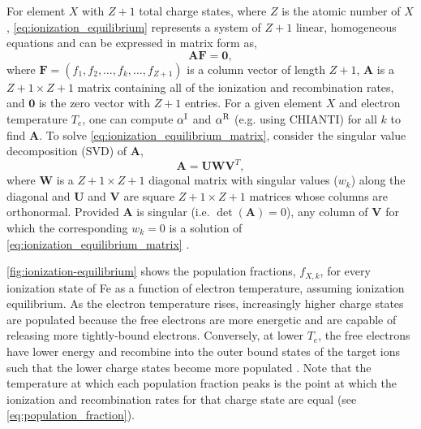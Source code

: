 For element $X$ with $Z+1$ total charge states, where $Z$ is the atomic number of $X$, \autoref{eq:ionization_equilibrium} represents a system of $Z+1$ linear, homogeneous equations and can be expressed in matrix form as,
\begin{equation}\label{eq:ionization_equilibrium_matrix}
    \mathbf{A}\mathbf{F} = \mathbf{0},
\end{equation}
where $\mathbf{F}=(f_1,f_2,\ldots,f_k,\ldots,f_{Z+1})$ is a column vector of length $Z+1$, $\mathbf{A}$ is a $Z+1{\times}Z+1$ matrix containing all of the ionization and recombination rates, and $\mathbf{0}$ is the zero vector with $Z+1$ entries. For a given element $X$ and electron temperature $T_e$, one can compute $\alpha^\textup{I}$ and $\alpha^\textup{R}$ (e.g. using CHIANTI) for all $k$ to find $\mathbf{A}$. To solve \autoref{eq:ionization_equilibrium_matrix}, consider the singular value decomposition (SVD) of $\mathbf{A}$,
\begin{equation}
    \mathbf{A} = \mathbf{U}\mathbf{W}\mathbf{V}^T,
\end{equation}
where $\mathbf{W}$ is a $Z+1{\times}Z+1$ diagonal matrix with singular values ($w_k$) along the diagonal and $\mathbf{U}$ and $\mathbf{V}$ are  square $Z+1{\times}Z+1$ matrices whose columns are orthonormal. Provided $\mathbf{A}$ is singular (i.e. $\det{(\mathbf{A})}=0$), any column of $\mathbf{V}$ for which the corresponding $w_k=0$ is a solution of \autoref{eq:ionization_equilibrium_matrix} \citep{press_numerical_1992}. 

\autoref{fig:ionization-equilibrium} shows the population fractions, $f_{X,k}$, for every ionization state of Fe as a function of electron temperature, assuming ionization equilibrium. As the electron temperature rises, increasingly higher charge states are populated because the free electrons are more energetic and are capable of releasing more tightly-bound electrons. Conversely, at lower $T_e$, the free electrons have lower energy and recombine into the outer bound states of the target ions such that the lower charge states become more populated \citep{bradshaw_collisional_2013}. Note that the temperature at which each population fraction peaks is the point at which the ionization and recombination rates for that charge state are equal (see \autoref{eq:population_fraction}).

